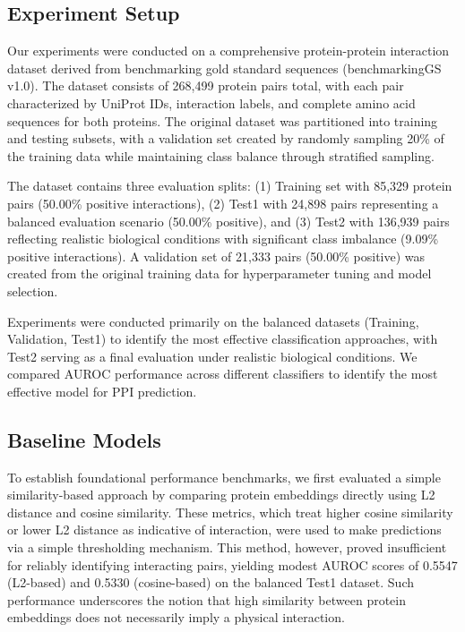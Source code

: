 \documentclass{article}
\begin{document}
\subsection{Experiment Setup}

Our experiments were conducted on a comprehensive protein-protein interaction dataset derived from benchmarking gold standard sequences (benchmarkingGS v1.0). The dataset consists of 268,499 protein pairs total, with each pair characterized by UniProt IDs, interaction labels, and complete amino acid sequences for both proteins. The original dataset was partitioned into training and testing subsets, with a validation set created by randomly sampling 20\% of the training data while maintaining class balance through stratified sampling.

The dataset contains three evaluation splits: (1) Training set with 85,329 protein pairs (50.00\% positive interactions), (2) Test1 with 24,898 pairs representing a balanced evaluation scenario (50.00\% positive), and (3) Test2 with 136,939 pairs reflecting realistic biological conditions with significant class imbalance (9.09\% positive interactions). A validation set of 21,333 pairs (50.00\% positive) was created from the original training data for hyperparameter tuning and model selection.

Experiments were conducted primarily on the balanced datasets (Training, Validation, Test1) to identify the most effective classification approaches, with Test2 serving as a final evaluation under realistic biological conditions. We compared AUROC performance across different classifiers to identify the most effective model for PPI prediction.

\subsection{Baseline Models}

To establish foundational performance benchmarks, we first evaluated a simple similarity-based approach by comparing protein embeddings directly using L2 distance and cosine similarity. These metrics, which treat higher cosine similarity or lower L2 distance as indicative of interaction, were used to make predictions via a simple thresholding mechanism. This method, however, proved insufficient for reliably identifying interacting pairs, yielding modest AUROC scores of 0.5547 (L2-based) and 0.5330 (cosine-based) on the balanced Test1 dataset. Such performance underscores the notion that high similarity between protein embeddings does not necessarily imply a physical interaction.
\end{document}
